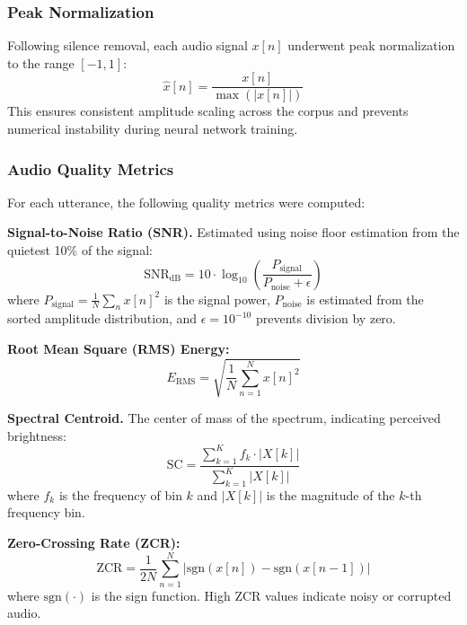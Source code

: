 \documentclass[conference]{IEEEtran}
\begin{document}
\subsubsection{Peak Normalization}
Following silence removal, each audio signal $x[n]$ underwent peak normalization to the range $[-1, 1]$:
\begin{equation}
\hat{x}[n] = \frac{x[n]}{\max(|x[n]|)}
\label{eq:peak_norm}
\end{equation}
This ensures consistent amplitude scaling across the corpus and prevents numerical instability during neural network training.

\subsubsection{Audio Quality Metrics}
For each utterance, the following quality metrics were computed:

\textbf{Signal-to-Noise Ratio (SNR).} Estimated using noise floor estimation from the quietest 10\% of the signal:
\begin{equation}
\text{SNR}_{\text{dB}} = 10 \cdot \log_{10}\left(\frac{P_{\text{signal}}}{P_{\text{noise}} + \epsilon}\right)
\label{eq:snr}
\end{equation}
where $P_{\text{signal}} = \frac{1}{N}\sum_{n} x[n]^2$ is the signal power, $P_{\text{noise}}$ is estimated from the sorted amplitude distribution, and $\epsilon = 10^{-10}$ prevents division by zero.

\textbf{Root Mean Square (RMS) Energy:}
\begin{equation}
E_{\text{RMS}} = \sqrt{\frac{1}{N}\sum_{n=1}^{N} x[n]^2}
\label{eq:rms}
\end{equation}

\textbf{Spectral Centroid.} The center of mass of the spectrum, indicating perceived brightness:
\begin{equation}
\text{SC} = \frac{\sum_{k=1}^{K} f_k \cdot |X[k]|}{\sum_{k=1}^{K} |X[k]|}
\label{eq:spectral_centroid}
\end{equation}
where $f_k$ is the frequency of bin $k$ and $|X[k]|$ is the magnitude of the $k$-th frequency bin.

\textbf{Zero-Crossing Rate (ZCR):}
\begin{equation}
\text{ZCR} = \frac{1}{2N}\sum_{n=1}^{N} |\text{sgn}(x[n]) - \text{sgn}(x[n-1])|
\label{eq:zcr}
\end{equation}
where $\text{sgn}(\cdot)$ is the sign function. High ZCR values indicate noisy or corrupted audio.
\end{document}
